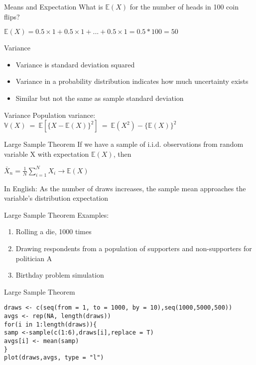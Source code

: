 \documentclass[presentation]{beamer}
\newcommand{\E}{\mathbb{E}}
\newcommand{\V}{\mathbb{V}}
\begin{document}
\begin{frame}[label={sec:org66c845f}]{Means and Expectation}
What is \(\E(X)\) for the number of heads in 100 coin flips?

\pause

\(\E(X) = 0.5\times 1 + 0.5\times 1+ ... + 0.5\times 1 = 0.5*100 = 50\)
\end{frame}

\begin{frame}[label={sec:orge210fce}]{Variance}
\begin{itemize}
\item Variance is standard deviation squared

\item Variance in a probability distribution indicates how much uncertainty exists

\item Similar \alert{but not the same} as sample standard deviation
\end{itemize}
\end{frame}

\begin{frame}[label={sec:org3435975}]{Variance}
Population variance: \(\V(X) \ = \ \E[\{X - \E(X)\}^2] \ = \ \E(X^2) - \{\E(X)\}^2\)
\end{frame}

\begin{frame}[label={sec:orgeea0c73}]{Large Sample Theorem}
If we have a sample of i.i.d. observations from random variable X with expectation \(\E(X)\), then

\(\bar{X}_{{n}} = \frac{1}{N} \sum_{i = 1}^{N} X_{i} \rightarrow \E(X)\)


\pause
In English:
As the number of draws increases, the sample mean approaches the variable's distribution expectation
\end{frame}

\begin{frame}[label={sec:org5deffe9}]{Large Sample Theorem}
Examples:
\begin{enumerate}
\item Rolling a die, 1000 times
\item Drawing respondents from a population of supporters and non-supporters for politician A
\item Birthday problem simulation
\end{enumerate}
\end{frame}


\begin{frame}[fragile,label={sec:orgb273875}]{Large Sample Theorem}
 \begin{verbatim}
draws <- c(seq(from = 1, to = 1000, by = 10),seq(1000,5000,500))
avgs <- rep(NA, length(draws))
for(i in 1:length(draws)){
samp <-sample(c(1:6),draws[i],replace = T)
avgs[i] <- mean(samp)
}
plot(draws,avgs, type = "l")
\end{verbatim}
\end{frame}
\end{document}
